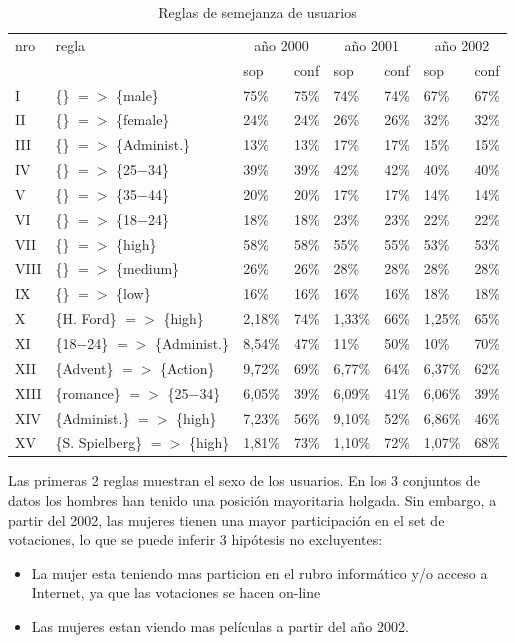 \documentclass[journal]{IEEEtran}
\begin{document}
\begin{table}[ht!]
\caption{Reglas de semejanza de usuarios}
\label{comparacion}
\centering
\begin{tabular}{|l l ||l l|l l|l l|}
	\hline
	nro & regla & 
	\multicolumn{2}{c|}{año 2000} & 
	\multicolumn{2}{c|}{año 2001} & 
	\multicolumn{2}{c|}{año 2002} \\
	     &  & sop & conf & sop & conf & sop & conf \\
	I    & \{\} $=$$>$ \{male\} & 75\% & 75\% & 74\% & 74\% & 67\% & 67\% \\
	II   & \{\} $=$$>$ \{female\} & 24\% & 24\% & 26\% & 26\% & 32\% & 32\% \\
	III  & \{\} $=$$>$ \{Administ.\} & 13\% & 13\% & 17\% & 17\% & 15\% & 15\% \\
	IV   & \{\} $=$$>$ \{25$-$34\} & 39\% & 39\% & 42\% & 42\% & 40\% & 40\% \\
	V    & \{\} $=$$>$ \{35$-$44\} & 20\% & 20\% & 17\% & 17\% & 14\% & 14\% \\
	VI   & \{\} $=$$>$ \{18$-$24\} & 18\% & 18\% & 23\% & 23\% & 22\% & 22\% \\
	VII  & \{\} $=$$>$ \{high\} & 58\% & 58\% & 55\% & 55\% & 53\% & 53\% \\
	VIII & \{\} $=$$>$ \{medium\} & 26\% & 26\% & 28\% & 28\% & 28\% & 28\% \\
	IX   & \{\} $=$$>$ \{low\} & 16\% & 16\% & 16\% & 16\% & 18\% & 18\% \\
	X    & \{H. Ford\} $=$$>$ \{high\} & 2,18\% & 74\% & 1,33\% & 66\% & 1,25\% & 65\% \\
	XI  & \{18$-$24\} $=$$>$ \{Administ.\} & 8,54\% & 47\% & 11\% & 50\% & 10\% & 70\% \\
	XII & \{Advent\} $=$$>$ \{Action\} & 9,72\% & 69\% & 6,77\% & 64\% & 6,37\% & 62\% \\
	XIII  & \{romance\} $=$$>$ \{25$-$34\} & 6,05\% & 39\% & 6,09\% & 41\% & 6,06\% & 39\% \\
	XIV   & \{Administ.\} $=$$>$ \{high\} & 7,23\% & 56\% & 9,10\% & 52\% & 6,86\% & 46\% \\
	XV  & \{S. Spielberg\} $=$$>$ \{high\} & 1,81\% & 73\% & 1,10\% & 72\% & 1,07\% & 68\% \\
	\hline
\end{tabular}
\end{table}

Las primeras 2 reglas muestran el sexo de los usuarios. 
En los 3 conjuntos de datos los hombres han tenido una posición mayoritaria holgada. 
Sin embargo, a partir del 2002, las mujeres tienen una
mayor participación en el set de votaciones, lo que se puede inferir 3 hipótesis
no excluyentes:
\begin{itemize}
\item La mujer esta teniendo mas particion en el rubro informático y/o acceso a Internet, ya que las 
votaciones se hacen on-line
\item Las mujeres estan viendo mas películas a partir del año 2002.
\end{itemize}
\end{document}
